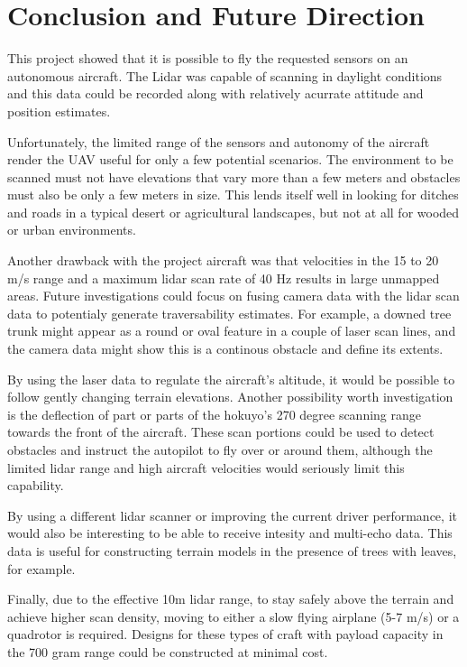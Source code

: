 \documentclass[a4paper,11pt]{report}
\begin{document}
\chapter{Conclusion and Future Direction}

This project showed that it is possible to fly the requested sensors on an autonomous aircraft. The Lidar was capable of scanning in daylight conditions and this data could be recorded along with relatively acurrate attitude and position estimates.

Unfortunately, the limited range of the sensors and autonomy of the aircraft render the UAV useful for only a few potential scenarios. The environment to be scanned must not have elevations that vary more than a few meters and obstacles must also be only a few meters in size. This lends itself well in looking for ditches and roads in a typical desert or agricultural landscapes, but not at all for wooded or urban environments.

Another drawback with the project aircraft was that velocities in the 15 to 20 m/s range and a maximum lidar scan rate of 40 Hz results in large unmapped areas. Future investigations could focus on fusing camera data with the lidar scan data to potentialy generate traversability estimates. For example, a downed tree trunk might appear as a round or oval feature in a couple of laser scan lines, and the camera data might show this is a continous obstacle and define its extents.

By using the laser data to regulate the aircraft's altitude, it would be possible to follow gently changing terrain elevations. Another possibility worth investigation is the deflection of part or parts of the hokuyo's 270 degree scanning range towards the front of the aircraft. These scan portions could be used to detect obstacles and instruct the autopilot to fly over or around them, although the limited lidar range and high aircraft velocities would seriously limit this capability.

By using a different lidar scanner or improving the current driver performance, it would also be interesting to be able to receive intesity and multi-echo data. This data is useful for constructing terrain models in the presence of trees with leaves, for example.

Finally, due to the effective 10m lidar range, to stay safely above the terrain and achieve higher scan density, moving to either a slow flying airplane (5-7 m/s) or a quadrotor is required. Designs for these types of craft with payload capacity in the 700 gram range could be constructed at minimal cost.
\end{document}
